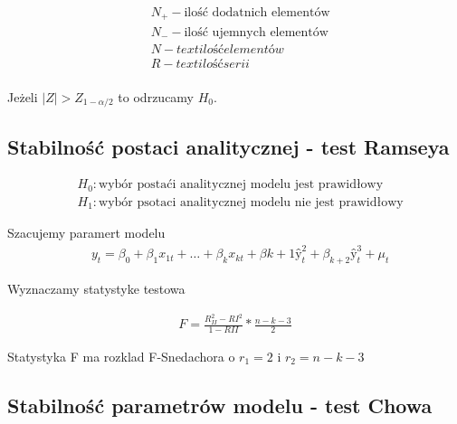 \begin{equation}
    \begin{split}
        &N_+ - \text{ilość dodatnich elementów} \\
        &N_- - \text{ilość ujemnych elementów} \\
        &N - text{ilość elementów} \\
        &R - text{ilość serii} \\
    \end{split}
\end{equation}


Jeżeli \(|Z| > Z_{1-\alpha/2}\) to odrzucamy \(H_0\).

\subsection{Stabilność postaci analitycznej - test Ramseya}\label{subsec:stabilność-postaci-analitycznej---test-ramseya}

\begin{equation}
    \begin{split}
        &H_0: \text{wybór postaći analitycznej modelu jest prawidłowy} \\
        &H_1: \text{wybór psotaci analitycznej modelu nie jest prawidłowy}
    \end{split}
\end{equation}


Szacujemy paramert modelu
\begin{equation}
    \begin{split}
        &y_{t} = \beta_{0} + \beta_{1}x_{1t} + \dots + \beta_{k}x_{kt} +\beta{k+1}ŷ_{t}^{2} + \beta_{k+2}ŷ_{t}^{3} + \mu_{t}
    \end{split}
\end{equation}

Wyznaczamy statystyke testowa

\begin{equation}
    \begin{split}
        F = \frac{R_{II}^{2} - R{I}^{2}}{1-R{II}} * \frac{n-k-3}{2}
    \end{split}
\end{equation}

Statystyka F ma rozklad F-Snedachora o \(r_1=2 \) i \(r_2=n-k-3\)

\subsection{Stabilność parametrów modelu - test Chowa}\label{subsec:stabilność-parametrów-modelu}

